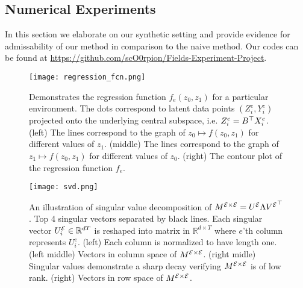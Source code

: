 \subsection{Numerical Experiments}

In this section we elaborate on our synthetic setting and provide evidence for admissability of our method in comparison to the naive method.
Our codes can be found at \href{https://github.com/scO0rpion/Fields-Experiment-Project}{https://github.com/scO0rpion/Fields-Experiment-Project}.

\begin{figure}[h!]
    \centering
    \texttt{[image: regression\_fcn.png]}
    \caption{Demonstrates the regression function $f_e(z_0, z_1)$ for a particular environment. The dots correspond to latent data points $(Z^{e}_i, Y^{e}_i)$ projected onto the underlying central subspace, i.e. $Z^{e}_i = B^{\top} X^{e}_i$. (left) The lines correspond to the graph of $z_0 \mapsto f(z_0,z_1)$ for different values of $z_1$. 
    (middle) The lines correspond to the graph of $z_1 \mapsto f(z_0,z_1)$ for different values of $z_0$.
    (right) The contour plot of the regression function $f_e$.}
\end{figure}

\begin{figure}[h!]
    \label{fig:singular}
    \centering
    \texttt{[image: svd.png]}
    \caption{An illustration of singular value decomposition of $M^{\mathcal{E} \times \mathcal{E}} = U^{\mathcal{E}} \Lambda {V^{ \mathcal{E} }}^{\top}$. Top 4 singular vectors separated by black lines. Each singular vector $U^{\mathcal{E}}_i \in \mathbb{R}^{dT}$ is reshaped into matrix in $\mathbb{R}^{d \times T}$ where $e$'th column represents $U_i^e$.
    (left) Each column is normalized to have length one. (left middle) Vectors in column space of $M^{\mathcal{E} \times \mathcal{E}}$. (right midle) Singular values demonstrate a sharp decay verifying $M^{\mathcal{E} \times \mathcal{E}}$ is of low rank. (right) Vectors in row space of $M^{\mathcal{E} \times \mathcal{E}}$. }
\end{figure}

